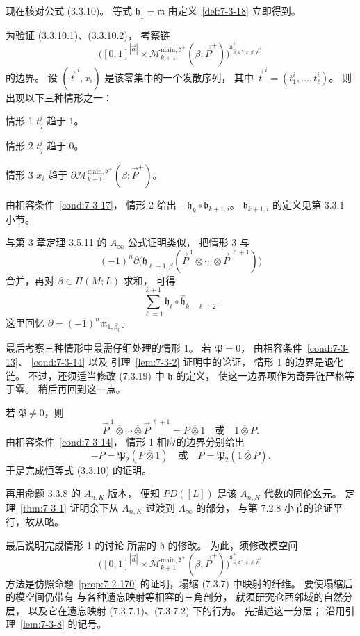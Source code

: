 
现在核对公式 (3.3.10)。
等式 $\mathfrak h_1=\mathfrak m$
由定义~\ref{def:7-3-18} 立即得到。

为验证 (3.3.10.1)、(3.3.10.2)，
考察链
\[
\bigl([0,1]^{|\vec a|}\times
\mathcal M^{\mathrm{main},\mathfrak d^+}_{k+1}
(\beta;\vec P^+)\bigr)
^{\mathfrak s^+_{\vec a,\mathfrak d^+,k,\beta,\vec P^+}}
\]
的边界。
设 $(\vec t^{\,i},x_i)$ 是该零集中的一个发散序列，
其中
$\vec t^{\,i}=(t_1^i,\ldots,t_\ell^i)$。
则出现以下三种情形之一：
\par\noindent\textup{情形 1}\quad
$t_j^i$ 趋于 $1$。
\par\noindent\textup{情形 2}\quad
$t_j^i$ 趋于 $0$。
\par\noindent\textup{情形 3}\quad
$x_i$ 趋于
$\partial\mathcal M^{\mathrm{main},\mathfrak d^+}_{k+1}
(\beta;\vec P^+)$。

由相容条件~\ref{cond:7-3-17}，
情形 2 给出
$-\mathfrak h_k\circ\mathfrak b_{k+1,i}$。
$\mathfrak b_{k+1,i}$ 的定义见第 3.3.1 小节。

与第 3 章定理 3.5.11 的
$A_\infty$ 公式证明类似，
把情形 3 与
\[
(-1)^n\partial\bigl(
\mathfrak h_{\ell+1,\beta}
(\vec P^{\,1}\mathbin{\overline\otimes}\cdots
\mathbin{\overline\otimes}\vec P^{\,\ell+1})
\bigr)
\]
合并，再对 $\beta\in\Pi(M;L)$ 求和，
可得
\[
\sum_{\ell=1}^{k+1}
\mathfrak h_\ell\circ
\widehat{\mathfrak h}_{k-\ell+2}.
\]
这里回忆
$\partial=(-1)^n\mathfrak m_{1,\beta_0}$。

最后考察三种情形中最需仔细处理的情形 1。
若 $\mathfrak P=0$，
由相容条件~\ref{cond:7-3-13}、
\ref{cond:7-3-14} 以及
引理~\ref{lem:7-3-2} 证明中的论证，
情形 1 的边界是退化链。
不过，还须适当修改 (7.3.19) 中
$\mathfrak h$ 的定义，
使这一边界项作为奇异链严格等于零。
稍后再回到这一点。

若 $\mathfrak P\ne0$，则
\[
\vec P^{\,1}\mathbin{\overline\otimes}\cdots
\mathbin{\overline\otimes}\vec P^{\,\ell+1}
=P\mathbin{\overline\otimes}1
\quad\text{或}\quad
1\mathbin{\overline\otimes}P.
\]
由相容条件~\ref{cond:7-3-14}，
情形 1 相应的边界分别给出
\[
-P=\mathfrak P_2(P\mathbin{\overline\otimes}1)
\quad\text{或}\quad
P=\mathfrak P_2(1\mathbin{\overline\otimes}P).
\]
于是完成恒等式 (3.3.10) 的证明。

再用命题 3.3.8 的 $A_{n,K}$ 版本，
便知 $PD([L])$ 是该 $A_{n,K}$ 代数的同伦幺元。
定理~\ref{thm:7-3-1} 证明余下从
$A_{n,K}$ 过渡到 $A_\infty$ 的部分，
与第 7.2.8 小节的论证平行，故从略。

最后说明完成情形 1 的讨论
所需的 $\mathfrak h$ 的修改。
为此，须修改模空间
\[
\bigl([0,1]^{|\vec a|}\times
\mathcal M^{\mathrm{main},\mathfrak d^+}_{k+1}
(\beta;\vec P^+)\bigr)
^{\mathfrak s^+_{\vec a,\mathfrak d^+,k,\beta,\vec P^+}}
\]
方法是仿照命题~\ref{prop:7-2-170}
的证明，塌缩 (7.3.7) 中映射的纤维。
要使塌缩后的模空间仍带有
与各种遗忘映射等相容的三角剖分，
就须研究仓西邻域的自然分层，
以及它在遗忘映射
(7.3.7.1)、(7.3.7.2) 下的行为。
先描述这一分层；
沿用引理~\ref{lem:7-3-8} 的记号。
